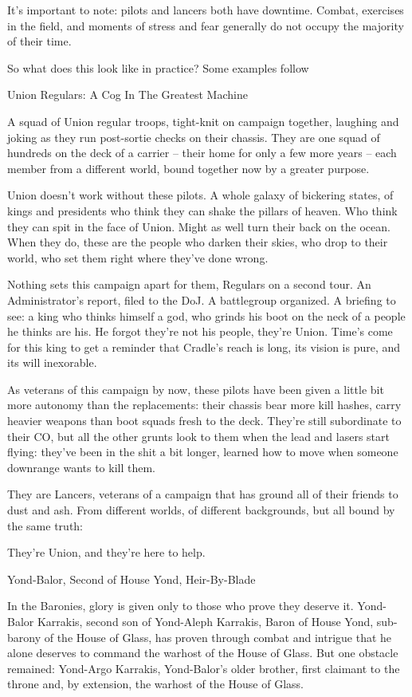 It’s important to note: pilots and lancers both have downtime. Combat, exercises in the field, and
moments of stress and fear generally do not occupy the majority of their time.

So what does this look like in practice? Some examples follow

Union Regulars: A Cog In The Greatest Machine

A squad of Union regular troops, tight-knit on campaign together, laughing and joking as they run
post-sortie checks on their chassis. They are one squad of hundreds on the deck of a carrier --
their home for only a few more years -- each member from a different world, bound together now
by a greater purpose.

Union doesn’t work without these pilots. A whole galaxy of bickering states, of kings and
presidents who think they can shake the pillars of heaven. Who think they can spit in the face of
Union. Might as well turn their back on the ocean. When they do, these are the people who
darken their skies, who drop to their world, who set them right where they’ve done wrong.

Nothing sets this campaign apart for them, Regulars on a second tour. An Administrator’s report,
filed to the DoJ. A battlegroup organized. A briefing to see: a king who thinks himself a god, who
grinds his boot on the neck of a people he thinks are his. He forgot they’re not his people, they’re
Union. Time’s come for this king to get a reminder that Cradle’s reach is long, its vision is pure,
and its will inexorable.

As veterans of this campaign by now, these pilots have been given a little bit more autonomy than
the replacements: their chassis bear more kill hashes, carry heavier weapons than boot squads
fresh to the deck. They’re still subordinate to their CO, but all the other grunts look to them when
the lead and lasers start flying: they’ve been in the shit a bit longer, learned how to move when
someone downrange wants to kill them.

They are Lancers, veterans of a campaign that has ground all of their friends to dust and ash.
From different worlds, of different backgrounds, but all bound by the same truth:

They’re Union, and they’re here to help.

Yond-Balor, Second of House Yond, Heir-By-Blade

In the Baronies, glory is given only to those who prove they deserve it. Yond-Balor Karrakis,
second son of Yond-Aleph Karrakis, Baron of House Yond, sub-barony of the House of Glass, has
proven through combat and intrigue that he alone deserves to command the warhost of the House
of Glass. But one obstacle remained: Yond-Argo Karrakis, Yond-Balor’s older brother, first
claimant to the throne and, by extension, the warhost of the House of Glass.




